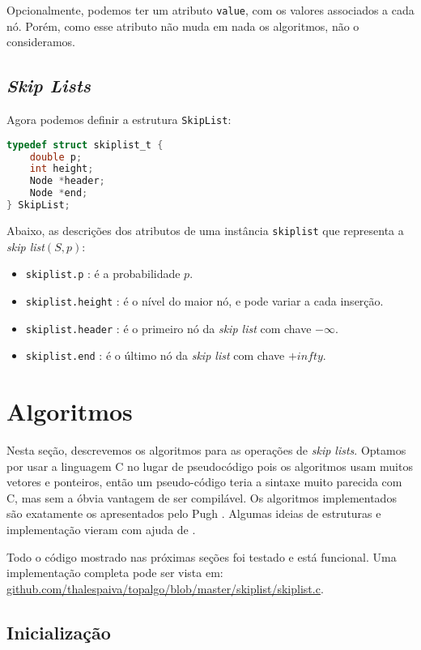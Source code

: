 \documentclass[paper=a4, fontsize=11pt]{scrartcl} %
\numberwithin{equation}{section}
\numberwithin{figure}{section}
\numberwithin{table}{section}
\numberwithin{definition}{section}
\numberwithin{theorem}{section}
\numberwithin{property}{section}
\numberwithin{proposition}{section}
\newcommand{\SLs}{\textit{Skip Lists}\xspace}
\newcommand{\sls}{\textit{skip lists}\xspace}
\newcommand{\skl}{\textit{skip list}\xspace}
\renewcommand{\sl}{\textit{skip list}\xspace}
\begin{document}
Opcionalmente, podemos ter um atributo \verb|value|, com os valores associados a cada nó. Porém, como esse
atributo não muda em nada os algoritmos, não o consideramos.

\subsection{\SLs}
Agora podemos definir a estrutura \verb|SkipList|:
\begin{lstlisting}[language=C]
typedef struct skiplist_t {
    double p;
    int height;
    Node *header;
    Node *end;
} SkipList;
\end{lstlisting}

Abaixo, as descrições dos atributos de uma instância \verb|skiplist| que representa a 
\skl $( S, p )$:

\begin{itemize}[noitemsep]
  \item \verb|skiplist.p| : é a probabilidade $p$.
  \item \verb|skiplist.height| : é o nível do maior nó, e pode variar a cada inserção.
  \item \verb|skiplist.header| : é o primeiro nó da \sl com chave $-\infty$.
  \item \verb|skiplist.end| : é o último nó da \sl com chave $+infty$.
\end{itemize}


\section{Algoritmos}

Nesta seção, descrevemos os algoritmos para as operações de \sls. Optamos por usar a linguagem C no lugar de 
pseudocódigo pois os algoritmos usam muitos vetores e ponteiros, então um pseudo-código teria a sintaxe muito parecida com
C, mas sem a óbvia vantagem de ser compilável. Os algoritmos implementados são exatamente os apresentados pelo
Pugh \cite{pugh1990skip}. Algumas ideias de estruturas e implementação vieram com ajuda de \cite{goodrich2014data}.

Todo o código mostrado nas próximas seções foi testado e está funcional. Uma implementação completa pode ser vista 
em: \url{github.com/thalespaiva/topalgo/blob/master/skiplist/skiplist.c}.
  
\subsection{Inicialização}
\end{document}
